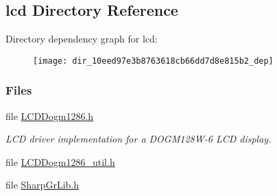 \subsection{lcd Directory Reference}
\label{dir_10eed97e3b8763618cb66dd7d8e815b2}
Directory dependency graph for lcd\+:
\nopagebreak
\begin{figure}[H]
\begin{center}
\leavevmode
\texttt{[image: dir\_10eed97e3b8763618cb66dd7d8e815b2\_dep]}
\end{center}
\end{figure}
\subsubsection*{Files}
\begin{DoxyCompactItemize}
\item 
file \hyperlink{_l_c_d_dogm1286_8h}{L\+C\+D\+Dogm1286.\+h}
\begin{DoxyCompactList}\small\item\em L\+C\+D driver implementation for a D\+O\+G\+M128\+W-\/6 L\+C\+D display. \end{DoxyCompactList}\item 
file \hyperlink{_l_c_d_dogm1286__util_8h}{L\+C\+D\+Dogm1286\+\_\+util.\+h}
\item 
file \hyperlink{_sharp_gr_lib_8h}{Sharp\+Gr\+Lib.\+h}
\end{DoxyCompactItemize}

